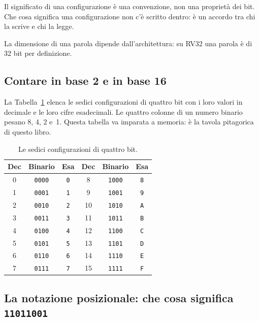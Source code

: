 \begin{prgconcept}
Il significato di una configurazione è una convenzione, non una proprietà dei
bit. Che cosa significa una configurazione non c'è scritto dentro: è un accordo
tra chi la scrive e chi la legge.
\end{prgconcept}

La dimensione di una parola dipende dall'architettura: su RV32 una parola è di
32 bit per definizione.

\subsection{Contare in base 2 e in base 16}

La Tabella~\ref{tab:info:hex} elenca le sedici configurazioni di quattro bit
con i loro valori in decimale e le loro cifre esadecimali. Le quattro colonne
di un numero binario pesano 8, 4, 2 e~1. Questa tabella va imparata a memoria:
è la tavola pitagorica di questo libro.

\begin{table}[htb]
\centering\small
\caption{Le sedici configurazioni di quattro bit.}\label{tab:info:hex}
\begin{tabular}{@{}ccc@{\qquad\qquad}ccc@{}}
\toprule
\textbf{Dec} & \textbf{Binario} & \textbf{Esa} & \textbf{Dec} & \textbf{Binario} & \textbf{Esa}\\
\midrule
0 & \texttt{0000} & \texttt{0} & 8 & \texttt{1000} & \texttt{8}\\
1 & \texttt{0001} & \texttt{1} & 9 & \texttt{1001} & \texttt{9}\\
2 & \texttt{0010} & \texttt{2} & 10 & \texttt{1010} & \texttt{A}\\
3 & \texttt{0011} & \texttt{3} & 11 & \texttt{1011} & \texttt{B}\\
4 & \texttt{0100} & \texttt{4} & 12 & \texttt{1100} & \texttt{C}\\
5 & \texttt{0101} & \texttt{5} & 13 & \texttt{1101} & \texttt{D}\\
6 & \texttt{0110} & \texttt{6} & 14 & \texttt{1110} & \texttt{E}\\
7 & \texttt{0111} & \texttt{7} & 15 & \texttt{1111} & \texttt{F}\\
\bottomrule
\end{tabular}
\end{table}

\subsection{La notazione posizionale: che cosa significa \texttt{11011001}}

